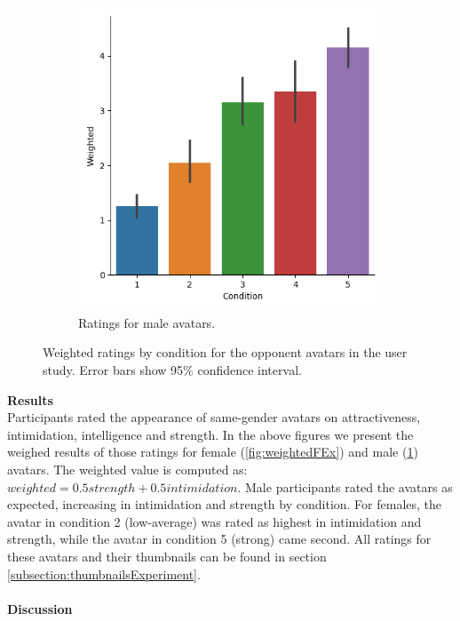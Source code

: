 \begin{figure}[H]
\begin{subfigure}[b]{0.4\textwidth}
         \includegraphics[width=\textwidth]{Files/Plots/weighted_ratings_male_experiment.png}
         \caption{Ratings for male avatars.}
         \label{fig:weightedMEx}
     \end{subfigure}
      \hspace*{\fill}
     \caption{Weighted ratings by condition for the opponent avatars in the user study. Error bars show 95\%  confidence interval.}
         \label{fig:weightedEX}
\end{figure} 
\textbf{Results}  \\
Participants rated the appearance of same-gender avatars on attractiveness, intimidation, intelligence and strength. In the above  figures we present the weighed results of those ratings for female (\ref{fig:weightedFEx}) and male (\ref{fig:weightedMEx}) avatars. The weighted value is computed as: $weighted=0.5strength+0.5intimidation$.
Male participants rated the avatars as expected, increasing in intimidation and strength by condition. For females, the avatar in condition 2 (low-average) was rated as highest in intimidation and strength, while the avatar in condition 5 (strong) came second. All ratings for these avatars and their thumbnails can be found in section \ref{subsection:thumbnailsExperiment}. \\
\\
\textbf{Discussion}\\
